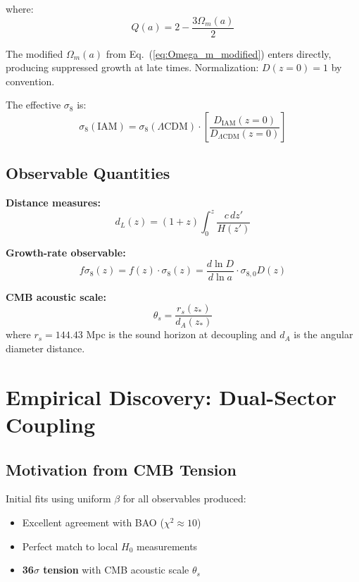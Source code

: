\documentclass[twocolumn,superscriptaddress,prl,amsmath,amssymb]{revtex4-2}
\begin{document}
where:
\begin{equation}
Q(a) = 2 - \frac{3\Omega_m(a)}{2}
\end{equation}

The modified $\Omega_m(a)$ from Eq.~(\ref{eq:Omega_m_modified}) enters directly, producing suppressed growth at late times. Normalization: $D(z=0) = 1$ by convention.

The effective $\sigma_8$ is:
\begin{equation}
\sigma_8(\text{IAM}) = \sigma_8(\Lambda\text{CDM}) \cdot \left[\frac{D_{\text{IAM}}(z=0)}{D_{\Lambda\text{CDM}}(z=0)}\right]
\end{equation}

\subsection{Observable Quantities}

\textbf{Distance measures:}
\begin{equation}
d_L(z) = (1+z) \int_0^z \frac{c\,dz'}{H(z')}
\end{equation}

\textbf{Growth-rate observable:}
\begin{equation}
f\sigma_8(z) = f(z) \cdot \sigma_8(z) = \frac{d\ln D}{d\ln a} \cdot \sigma_{8,0} D(z)
\end{equation}

\textbf{CMB acoustic scale:}
\begin{equation}
\theta_s = \frac{r_s(z_*)}{d_A(z_*)}
\end{equation}
where $r_s = 144.43$ Mpc is the sound horizon at decoupling and $d_A$ is the angular diameter distance.

\section{Empirical Discovery: Dual-Sector Coupling}

\subsection{Motivation from CMB Tension}

Initial fits using uniform $\beta$ for all observables produced:
\begin{itemize}
\item Excellent agreement with BAO ($\chi^2 \approx 10$)
\item Perfect match to local $H_0$ measurements
\item \textbf{36$\sigma$ tension} with CMB acoustic scale $\theta_s$
\end{itemize}
\end{document}
